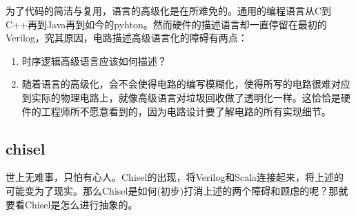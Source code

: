 \documentclass{article}
\begin{document}
为了代码的简洁与复用，语言的高级化是在所难免的。通用的编程语言从C到C++再到Java再到如今的pyhton。然而硬件的描述语言却一直停留在最初的Verilog，究其原因，电路描述高级语言化的障碍有两点：
\begin{enumerate}
	\item 时序逻辑高级语言应该如何描述？
	\item 随着语言的高级化，会不会使得电路的编写模糊化，使得所写的电路很难对应到实际的物理电路上，就像高级语言对垃圾回收做了透明化一样。这恰恰是硬件的工程师所不愿意看到的，因为电路设计要了解电路的所有实现细节。
\end{enumerate}

\subsection{chisel}
世上无难事，只怕有心人。Chisel的出现，将Verilog和Scala连接起来，将上述的可能变为了现实。那么Chisel是如何(初步)打消上述的两个障碍和顾虑的呢？那就要看Chisel是怎么进行抽象的。
\end{document}
